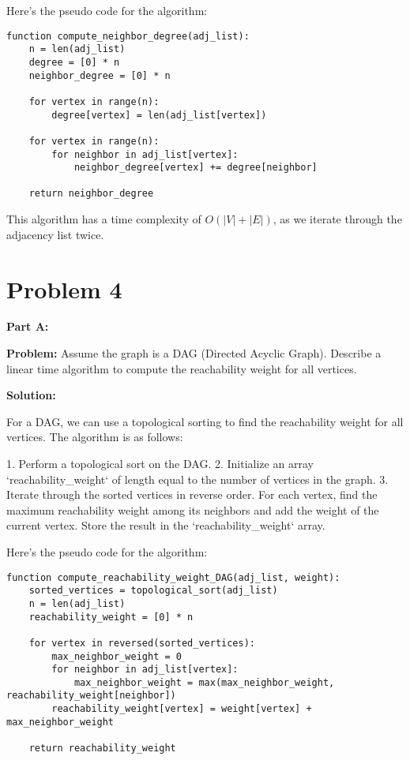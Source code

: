 \documentclass[11pt]{article}
\begin{document}
    Here's the pseudo code for the algorithm:

    \begin{verbatim}
function compute_neighbor_degree(adj_list):
    n = len(adj_list)
    degree = [0] * n
    neighbor_degree = [0] * n

    for vertex in range(n):
        degree[vertex] = len(adj_list[vertex])

    for vertex in range(n):
        for neighbor in adj_list[vertex]:
            neighbor_degree[vertex] += degree[neighbor]

    return neighbor_degree
    \end{verbatim}

    This algorithm has a time complexity of $O(|V| + |E|)$, as we iterate through the adjacency list twice.


    \section{Problem 4}

    \textbf{Part A:}

    \textbf{Problem:} Assume the graph is a DAG (Directed Acyclic Graph). Describe a linear time algorithm to compute the reachability weight for all vertices.

    \textbf{Solution:}

    For a DAG, we can use a topological sorting to find the reachability weight for all vertices. The algorithm is as follows:

    1. Perform a topological sort on the DAG.
    2. Initialize an array `reachability_weight` of length equal to the number of vertices in the graph.
    3. Iterate through the sorted vertices in reverse order. For each vertex, find the maximum reachability weight among its neighbors and add the weight of the current vertex. Store the result in the `reachability_weight` array.

    Here's the pseudo code for the algorithm:

    \begin{verbatim}
function compute_reachability_weight_DAG(adj_list, weight):
    sorted_vertices = topological_sort(adj_list)
    n = len(adj_list)
    reachability_weight = [0] * n

    for vertex in reversed(sorted_vertices):
        max_neighbor_weight = 0
        for neighbor in adj_list[vertex]:
            max_neighbor_weight = max(max_neighbor_weight, reachability_weight[neighbor])
        reachability_weight[vertex] = weight[vertex] + max_neighbor_weight

    return reachability_weight
    \end{verbatim}
\end{document}
